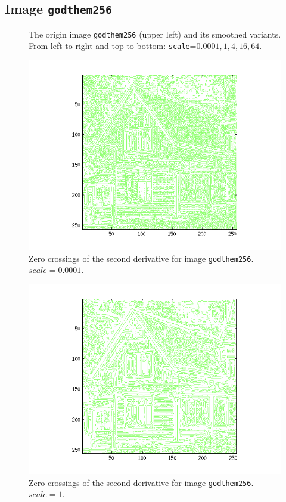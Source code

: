 
\subsection{Image \texttt{godthem256}}

\begin{figure}[H]
	\centering
  \scalebox{0.8}{}
  \caption{The origin image \texttt{godthem256} (upper left) and its smoothed variants.
    From left to right and top to bottom: \texttt{scale}=$0.0001, 1, 4, 16, 64$.}
	\label{fig:Q4_smoothed_house}
\end{figure}


\begin{figure}[H]
	\centering
	\includegraphics[scale=0.8]{./images/Q4/vv/0.0001.png}
	\caption{Zero crossings of the second derivative for image \texttt{godthem256}. $scale = 0.0001$.}
	\label{fig:Q4_vv_0.0001}
\end{figure}

\begin{figure}[H]
	\centering
	\includegraphics[scale=0.8]{./images/Q4/vv/1.png}
	\caption{Zero crossings of the second derivative for image \texttt{godthem256}. $scale = 1$.}
	\label{fig:Q4_vv_1}
\end{figure}

